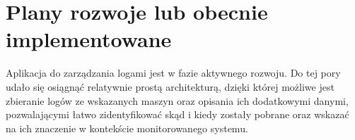 \section{Plany rozwoje lub obecnie implementowane}
\label{chapter:application:plans}

Aplikacja do zarządzania logami jest w fazie aktywnego rozwoju. 
Do tej pory udało się osiągnąć relatywnie prostą architekturą, dzięki której
możliwe jest zbieranie logów ze wskazanych maszyn oraz opisania ich
dodatkowymi danymi, pozwalającymi łatwo zidentyfikować skąd i kiedy
zostały pobrane oraz wskazać na ich znaczenie w kontekście monitorowanego systemu.



